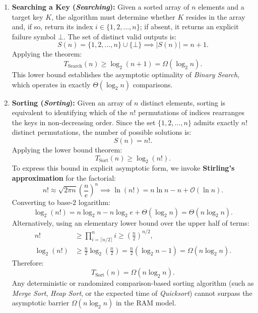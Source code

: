 \begin{enumerate}
  \item \textbf{Searching a Key (\textit{Searching}):}
  Given a sorted array of $n$ elements and a target key $K$, the algorithm must determine whether $K$ resides in the array and, if so, return its index $i \in \{1, 2, \dots, n\}$; if absent, it returns an explicit failure symbol $\bot$. The set of distinct valid outputs is:
  \begin{equation}
    S(n) = \{1, 2, \dots, n\} \cup \{\bot\} \implies |S(n)| = n + 1.
  \end{equation}
  Applying the theorem:
  \begin{equation}
    T_{\text{Search}}(n) \ge \log_2(n + 1) = \Omega(\log_2 n).
  \end{equation}
  This lower bound establishes the asymptotic optimality of \textit{Binary Search}, which operates in exactly $\Theta(\log_2 n)$ comparisons.

  \item \textbf{Sorting (\textit{Sorting}):}
  Given an array of $n$ distinct elements, sorting is equivalent to identifying which of the $n!$ permutations of indices rearranges the keys in non-decreasing order. Since the set $\{1, 2, \dots, n\}$ admits exactly $n!$ distinct permutations, the number of possible solutions is:
  \begin{equation}
    S(n) = n!.
  \end{equation}
  Applying the lower bound theorem:
  \begin{equation}
    T_{\text{Sort}}(n) \ge \log_2(n!).
  \end{equation}
  To express this bound in explicit asymptotic form, we invoke \textbf{Stirling's approximation} for the factorial:
  \begin{equation}
    n! \approx \sqrt{2\pi n} \left(\frac{n}{e}\right)^n \implies \ln(n!) = n \ln n - n + \mathcal{O}(\ln n).
  \end{equation}
  Converting to base-$2$ logarithm:
  \begin{equation}
    \log_2(n!) = n \log_2 n - n \log_2 e + \Theta(\log_2 n) = \Theta(n \log_2 n).
  \end{equation}
  Alternatively, using an elementary lower bound over the upper half of terms:
  \begin{align}
    n! &\ge \prod_{i = \lceil n/2 \rceil}^{n} i \ge \left(\frac{n}{2}\right)^{n/2}, \\
    \log_2(n!) &\ge \frac{n}{2} \log_2\left(\frac{n}{2}\right) = \frac{n}{2}(\log_2 n - 1) = \Omega(n \log_2 n).
  \end{align}
  Therefore:
  \begin{equation}
    T_{\text{Sort}}(n) = \Omega(n \log_2 n).
  \end{equation}
  Any deterministic or randomized comparison-based sorting algorithm (such as \textit{Merge Sort}, \textit{Heap Sort}, or the expected time of \textit{Quicksort}) cannot surpass the asymptotic barrier $\Omega(n \log_2 n)$ in the RAM model.
\end{enumerate}

